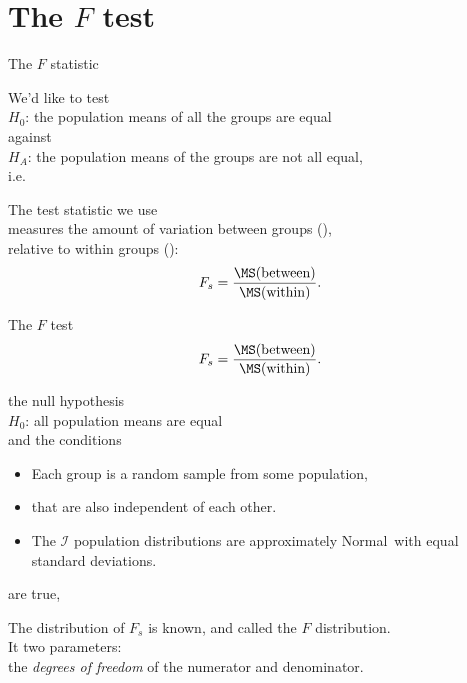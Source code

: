 \section{The $F$ test}

\begin{frame}{The $F$ statistic}

  We'd like to test\\
    \hspace{2em} $H_0$: the population means of all the groups are equal \\
  against \\
    \hspace{2em} $H_A$: the population means of the groups are not all equal, \\
  i.e.\ 

  \vspace{2em}

    The \alert{test statistic} we use \\
    measures the amount of variation between groups (), \\
    relative to within groups ():
    \[
        F_s = \frac{ \MS(\text{between}) }{ \MS(\text{within}) } .
    \]

\end{frame}

\begin{frame}{The $F$ test}
    \[
        F_s = \frac{ \MS(\text{between}) }{ \MS(\text{within}) } .
    \]
    \vspace{2em}

     the null hypothesis\\
    \hspace{3em} $H_0$: all population means are equal \\
    and the conditions
    \begin{itemize}
      \item Each group is a random sample from some population,
      \item that are also independent of each other.
      \item The $\mathcal{I}$ population distributions are approximately Normal\
        with equal standard deviations.
    \end{itemize}
    are true, 

    \vspace{2em}

    The distribution of $F_s$ is known, and called 
    the \alert{$F$ distribution}. \\
    It  two parameters: \\
    the \emph{degrees of freedom} of the numerator and denominator.


\end{frame}


